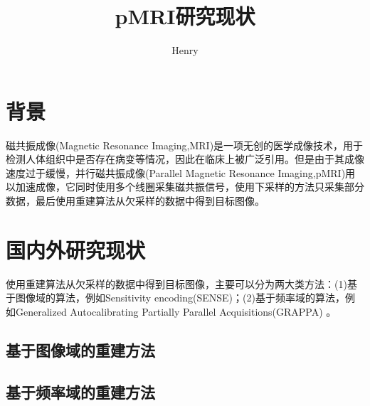 \documentclass[11pt]{article}
\title{pMRI研究现状}
\author{Henry}
\begin{document}
	\maketitle 
	
	\section{背景}
	\par 磁共振成像(Magnetic Resonance Imaging,MRI)是一项无创的医学成像技术，用于检测人体组织中是否存在病变等情况，因此在临床上被广泛引用。但是由于其成像速度过于缓慢，并行磁共振成像(Parallel Magnetic Resonance Imaging,pMRI)用以加速成像，它同时使用多个线圈采集磁共振信号，使用下采样的方法只采集部分数据，最后使用重建算法从欠采样的数据中得到目标图像。
	\section{国内外研究现状}
	\par 使用重建算法从欠采样的数据中得到目标图像，主要可以分为两大类方法：(1)基于图像域的算法，例如Sensitivity encoding(SENSE)\cite{pruessmann1999sense}；(2)基于频率域的算法，例如Generalized Autocalibrating Partially Parallel Acquisitions(GRAPPA) \cite{griswold2002generalized}。
		
	\subsection{基于图像域的重建方法}
	\par
	
	
	\subsection{基于频率域的重建方法} 
	
	\newpage
	
\end{document}
